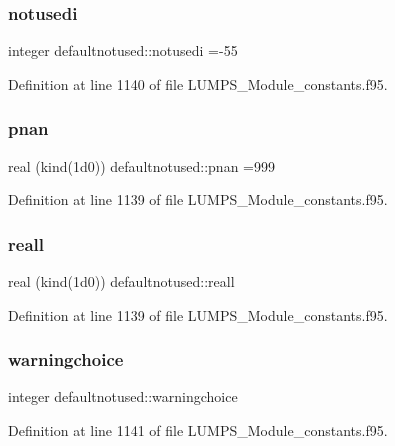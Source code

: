 \subsubsection{\texorpdfstring{notusedi}{notusedi}}
{\footnotesize\ttfamily integer defaultnotused\+::notusedi =-\/55}



Definition at line 1140 of file L\+U\+M\+P\+S\+\_\+\+Module\+\_\+constants.\+f95.

\mbox{\label{namespacedefaultnotused_abe169835df07a0da3ef05d9386ac49e8}} 
\subsubsection{\texorpdfstring{pnan}{pnan}}
{\footnotesize\ttfamily real (kind(1d0)) defaultnotused\+::pnan =999}



Definition at line 1139 of file L\+U\+M\+P\+S\+\_\+\+Module\+\_\+constants.\+f95.

\mbox{\label{namespacedefaultnotused_acc4adc83f26d421a6b79e44ae8a57896}} 
\subsubsection{\texorpdfstring{reall}{reall}}
{\footnotesize\ttfamily real (kind(1d0)) defaultnotused\+::reall}



Definition at line 1139 of file L\+U\+M\+P\+S\+\_\+\+Module\+\_\+constants.\+f95.

\mbox{\label{namespacedefaultnotused_afca6daa7573cc38632f70be01568f266}} 
\subsubsection{\texorpdfstring{warningchoice}{warningchoice}}
{\footnotesize\ttfamily integer defaultnotused\+::warningchoice}



Definition at line 1141 of file L\+U\+M\+P\+S\+\_\+\+Module\+\_\+constants.\+f95.

